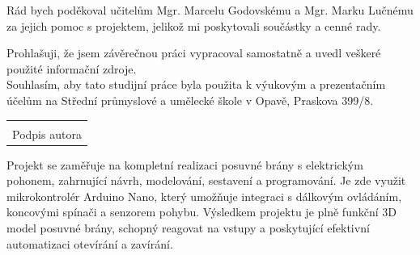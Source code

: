 \documentclass[12pt, a4paper, twoside]{report}
\newcommand\datumOdevzdani{1. 1. 2024} %
\begin{document}
	
	
	
	\newpage
	
	
	\noindent Rád bych poděkoval učitelům Mgr. Marcelu Godovskému a Mgr. Marku Lučnému za jejich pomoc s projektem, jelikož mi poskytovali součástky a cenné rady.\\
	
	\vspace{0.6 \textheight}
	
	\noindent Prohlašuji, že jsem závěrečnou práci vypracoval samostatně a uvedl veškeré použité informační zdroje.\\
	\noindent Souhlasím, aby tato studijní práce byla použita k výukovým a prezentačním účelům na Střední průmyslové a umělecké škole v Opavě, Praskova 399/8.
	\vfill
	\noindent{V Opavě \datumOdevzdani\\}
	\noindent
	\begin{minipage}{\linewidth}
		\hspace{9.5cm} 
		\begin{tabular}{@{}p{6cm}@{}}
			\dotfill \\
			Podpis autora
		\end{tabular}
	\end{minipage}
	
	
	\newpage
	
	\noindent Projekt se zaměřuje na kompletní realizaci posuvné brány s elektrickým pohonem, zahrnující návrh, modelování, sestavení a programování. Je zde využit mikrokontrolér Arduino Nano, který umožňuje integraci s dálkovým ovládáním, koncovými spínači a senzorem pohybu. Výsledkem projektu je plně funkční 3D model posuvné brány, schopný reagovat na vstupy a poskytující efektivní automatizaci otevírání a zavírání.  \\
	
	
\end{document}
